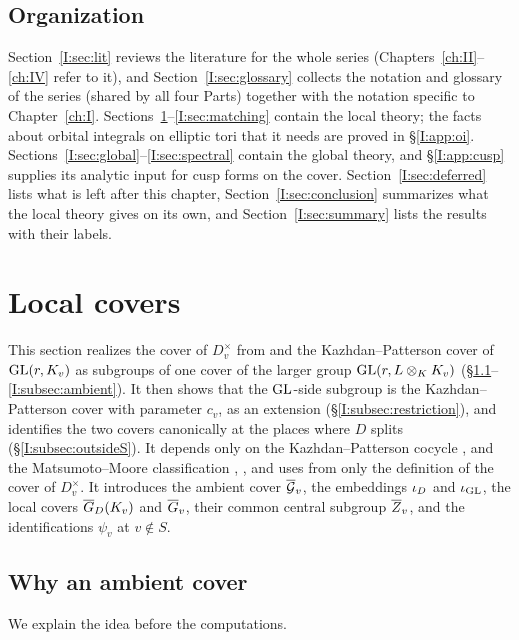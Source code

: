 \subsection{Organization}
Section~\ref{I:sec:lit} reviews the literature for the whole series (Chapters~\ref{ch:II}--\ref{ch:IV} refer to it), and Section~\ref{I:sec:glossary} collects the notation and glossary of the series (shared by all four Parts) together with the notation specific to Chapter~\ref{ch:I}. Sections~\ref{I:sec:covers}--\ref{I:sec:matching} contain the local theory; the facts about orbital integrals on elliptic tori that it needs are proved in \S\ref{I:app:oi}. Sections~\ref{I:sec:global}--\ref{I:sec:spectral} contain the global theory, and \S\ref{I:app:cusp} supplies its analytic input for cusp forms on the cover. Section~\ref{I:sec:deferred} lists what is left after this chapter, Section~\ref{I:sec:conclusion} summarizes what the local theory gives on its own, and Section~\ref{I:sec:summary} lists the results with their labels.


\section{Local covers}\label{I:sec:covers}
This section realizes the cover of $D_v^\times$ from \cite{JC26a} and the Kazhdan--Patterson cover of $\mathrm{GL}(r,K_v)$ as subgroups of one cover of the larger group $\mathrm{GL}(r,L\otimes_KK_v)$ (\S\ref{I:subsec:why}--\ref{I:subsec:ambient}). It then shows that the $\mathrm{GL}$-side subgroup is the Kazhdan--Patterson cover with parameter $c_v$, as an extension (\S\ref{I:subsec:restriction}), and identifies the two covers canonically at the places where $D$ splits (\S\ref{I:subsec:outsideS}). It depends only on the Kazhdan--Patterson cocycle \cite[\S0.1]{KP84}, \cite[\S2]{FK86} and the Matsumoto--Moore classification \cite{Mat69}, \cite{Moo68}, and uses from \cite{JC26a} only the definition of the cover of $D_v^\times$. It introduces the ambient cover $\overline{\mathcal{G}}_v$, the embeddings $\iota_D$ and $\iota_{\mathrm{GL}}$, the local covers $\overline{G}_D(K_v)$ and $\overline{G}_v$, their common central subgroup $\overline{Z}_v$, and the identifications $\psi_v$ at $v\notin S$.

\subsection{Why an ambient cover}\label{I:subsec:why}
We explain the idea before the computations.

